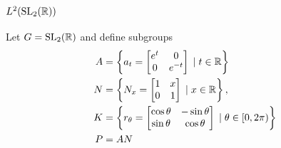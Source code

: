 \documentclass[11pt]{amsart}
\newcommand{\hsp}{\hspace{1mm}}
\newcommand{\set}[2]{\left\{ #1 \hsp| \hsp #2\right\}}
\newcommand{\ind}{\operatorname{ind}}
\begin{document}
%
%

\subsection{$L^{2}(\operatorname{SL}_{2}(\mathbb{R}))$}
 Let $G=\operatorname{SL}_{2}(\mathbb{R})$ and define subgroups
	 \begin{align*}
		A&=\set{a_{t}=\Tbt{e^{t}}{0}{0}{e^{-t}}}{t \in \R} \\
		N&=\set{N_{x}=\Tbt{1}{x}{0}{1}}{x\in \R}, \\
		K&=\set{r_{\theta}=\Tbt{\cos \theta}{-\sin \theta}{\sin \theta}{\cos \theta}}{\theta \in [0,2\pi)} \\
		P&=AN
	\end{align*}
\end{document}

